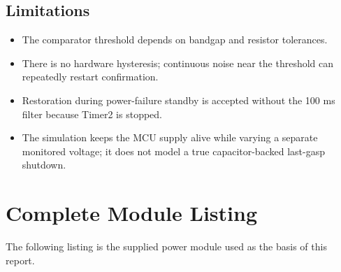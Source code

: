 \documentclass[11pt,a4paper]{article}
\begin{document}
\subsection{Limitations}
\begin{itemize}
  \item The comparator threshold depends on bandgap and resistor tolerances.
  \item There is no hardware hysteresis; continuous noise near the threshold can repeatedly restart confirmation.
  \item Restoration during power-failure standby is accepted without the 100 ms filter because Timer2 is stopped.
  \item The simulation keeps the MCU supply alive while varying a separate monitored voltage; it does not model a true capacitor-backed last-gasp shutdown.
\end{itemize}

\section{Complete Module Listing}
The following listing is the supplied power module used as the basis of this report.
\end{document}
